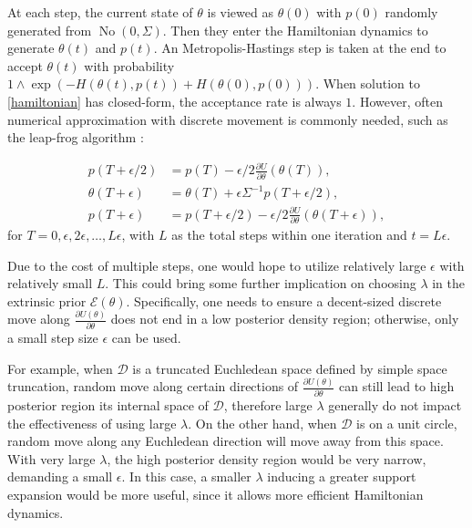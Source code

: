 \documentclass[10pt]{article}
\newcommand{\mc}[1]{\mathcal{#1}}
\DeclareMathOperator{\No}{No}
\begin{document}
At each step, the current state of $\theta$ is viewed as $\theta(0)$ with $p(0)$ randomly generated from $\No(0, \Sigma)$. Then they enter the Hamiltonian dynamics to generate $\theta(t)$ and $p(t)$. An Metropolis-Hastings step is taken at the end to accept $\theta(t)$ with probability $1\wedge \exp  \left( - H(\theta(t),p(t)) + H(\theta(0),p(0))\right)$. When solution to \eqref{hamiltonian} has closed-form, the acceptance rate is always $1$. However, often numerical approximation with discrete movement is commonly needed, such as the leap-frog algorithm \citep{neal2011mcmc}:

\begin{equation}
\begin{aligned}
\label{leap-frog}
p(T+ \epsilon/2) & = p(T) - \epsilon/2 \frac{\partial U}{\partial  \theta } ( \theta (T)),\\
 \theta (T + \epsilon) & =  \theta (T) + \epsilon \Sigma^{-1}p(T+  \epsilon/2),\\
p(T+ \epsilon) &= p(T+ \epsilon/2) - \epsilon/2 \frac{\partial U}{\partial  \theta } ( \theta (T + \epsilon)),
\end{aligned}
\end{equation}
for $T=0,\epsilon, 2\epsilon,\ldots, L\epsilon$, with $L$ as the total steps within one iteration and $t= L\epsilon$.

Due to the cost of multiple steps, one would hope to utilize relatively large $\epsilon$ with relatively small $L$. This could bring some further implication on choosing $\lambda$ in the extrinsic prior $\mc E(\theta)$. Specifically, one needs to ensure a decent-sized discrete move along $\frac{\partial U(\theta)}{\partial \theta}$ does not end in a low posterior density region; otherwise, only a small step size $\epsilon$ can be used.

For example, when $\mc D$ is a truncated Euchledean space defined by simple space truncation, random move along certain directions of $\frac{\partial U(\theta)}{\partial \theta}$ can still lead to high posterior region its internal space of $\mc D$, therefore large $\lambda$ generally do not impact the effectiveness of using large $\lambda$. On the other hand, when $\mc D$ is on a unit circle, random move along any Euchledean direction will move away from this space. With very large $\lambda$, the high posterior density region would be very narrow, demanding a small $\epsilon$. In this case, a smaller $\lambda$ inducing a greater support expansion would be more useful, since it allows more efficient Hamiltonian dynamics.
 
\end{document}
